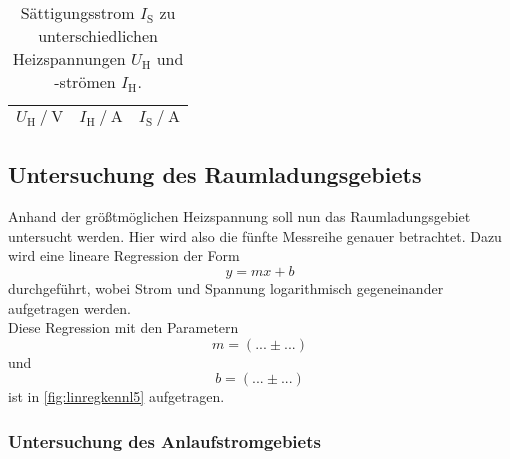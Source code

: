 \begin{table}
    \centering
    \caption{Sättigungsstrom $I_\text{S}$ zu unterschiedlichen \\ Heizspannungen $U_\text{H}$ und -strömen $I_\text{H}$.}
    \label{tab:sättigungsstromis}
    \begin{tabular}{S S S}
        \toprule
        {$U_\text{H} \mathbin{/} \unit{\volt}$} & {$I_\text{H} \mathbin{/} \unit{\ampere}$} & {$I_\text{S} \mathbin{/} \unit{\ampere}$} \\
        \midrule




        \bottomrule
    \end{tabular}
\end{table}


\subsection{Untersuchung des Raumladungsgebiets}

Anhand der größtmöglichen Heizspannung soll nun das Raumladungsgebiet untersucht werden.
Hier wird also die fünfte Messreihe genauer betrachtet.
Dazu wird eine lineare Regression der Form
\begin{equation*}
    y = m x + b
\end{equation*}
durchgeführt, wobei Strom und Spannung logarithmisch gegeneinander aufgetragen werden. \\

Diese Regression mit den Parametern
\begin{equation*}
    m = (... \pm ...)
\end{equation*}
und
\begin{equation*}
    b = (... \pm ...)
\end{equation*}
ist in \autoref{fig:linregkennl5} aufgetragen.



\subsubsection{Untersuchung des Anlaufstromgebiets}

